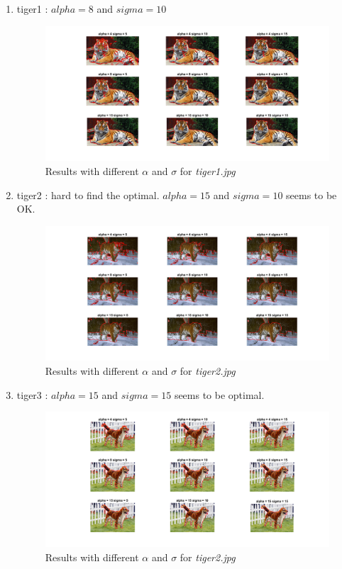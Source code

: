 \documentclass{article}
\begin{document}
\begin{enumerate}
\begin{enumerate}
    
    \item tiger1 : $alpha = 8$ and $sigma = 10$
        \begin{figure}[H]
        \centering
        \includegraphics[width=1.2\linewidth]{graphcut_sigma_alpha1.png}
        \caption{Results with different $\alpha$ and $\sigma$ for \textit{tiger1.jpg}}
        \label{fig:5111}
    \end{figure}
    
    \item tiger2 : hard to find the optimal. $alpha = 15$ and $sigma = 10$ seems to be OK.
        \begin{figure}[H]
        \centering
        \includegraphics[width=1.2\linewidth]{graphcut_sigma_alpha2.png}
        \caption{Results with different $\alpha$ and $\sigma$ for \textit{tiger2.jpg}}
        \label{fig:5112}
    \end{figure}
    
    \item tiger3 : $alpha = 15$ and $sigma = 15$ seems to be optimal.
        \begin{figure}[H]
        \centering
        \includegraphics[width=1.2\linewidth]{graphcut_sigma_alpha3.png}
        \caption{Results with different $\alpha$ and $\sigma$ for \textit{tiger2.jpg}}
        \label{fig:5113}
    \end{figure}
    

\end{enumerate}
\end{enumerate}
\end{document}
